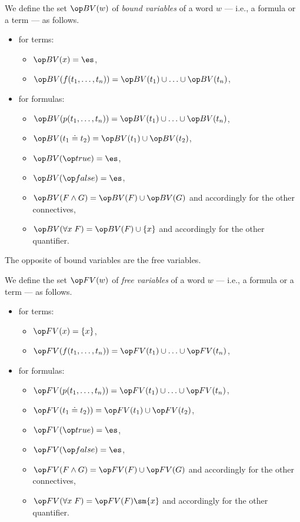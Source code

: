 \begin{definition}\label{def:fol:bv}
We define the set $\BV(w)$ of \emph{bound variables} of a word $w$ --- i.e., a formula or a term --- as follows.
\begin{itemize}
  \item for terms:
   \begin{itemize}
    \item $\BV(x)=\es$,
    \item $\BV(f(t_1,\ldots,t_n))=\BV(t_1)\cup\ldots\cup\BV(t_n)$,
   \end{itemize}
  \item for formulas:
   \begin{itemize}
    \item $\BV(p(t_1,\ldots,t_n))=\BV(t_1)\cup\ldots\cup\BV(t_n)$,
    \item $\BV(t_1\doteq t_2)=\BV(t_1)\cup\BV(t_2)$,
    \item $\BV(\true)=\es$,
    \item $\BV(\false)=\es$,
    \item $\BV(F\wedge G)=\BV(F)\cup\BV(G)$ and accordingly for the other connectives,
    \item $\BV(\forall x\;F)=\BV(F)\cup\{x\}$ and accordingly for the other quantifier.
  \end{itemize}
\end{itemize}
\end{definition}

The opposite of bound variables are the free variables.
\begin{definition}\label{def:fol:fv}
We define the set $\FV(w)$ of \emph{free variables} of a word $w$ --- i.e., a formula or a term --- as follows.
\begin{itemize}
  \item for terms:
   \begin{itemize}
    \item $\FV(x)=\{x\}$,
    \item $\FV(f(t_1,\ldots,t_n))=\FV(t_1)\cup\ldots\cup\FV(t_n)$,
   \end{itemize}
  \item for formulas:
   \begin{itemize}
    \item $\FV(p(t_1,\ldots,t_n))=\FV(t_1)\cup\ldots\cup\FV(t_n)$,
    \item $\FV(t_1\doteq t_2))=\FV(t_1)\cup\FV(t_2)$,
    \item $\FV(\true)=\es$,
    \item $\FV(\false)=\es$,
    \item $\FV(F\wedge G)=\FV(F)\cup\FV(G)$ and accordingly for the other connectives,
    \item $\FV(\forall x\;F)=\FV(F)\sm\{x\}$ and accordingly for the other quantifier.
  \end{itemize}
\end{itemize}
\end{definition}


